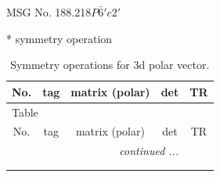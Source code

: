 \documentclass[fleqn,8pt]{jsarticle}
\begin{document}
\setcounter{MaxMatrixCols}{32}

\renewcommand{\tablename}{Table~}
\renewcommand{\figurename}{Figure~}
\begin{center}
\LARGE
MSG No. 188.218\quad$P\bar{6}'c2'$
\end{center}
* symmetry operation
\renewcommand{\arraystretch}{1.3}
\begin{longtable}{ccccc}
\caption{Symmetry operations for 3d polar vector.}
 \\
 \hline \hline
No. & tag & matrix (polar) & det & TR \\ \hline \endfirsthead

\multicolumn{4}{l}{\tablename\ \thetable{}} \\
 \hline \hline
No. & tag & matrix (polar) & det & TR \\ \hline \endhead

 \hline \hline
\multicolumn{4}{r}{\footnotesize\it continued ...} \\ \endfoot

 \hline \hline
\multicolumn{4}{r}{} \\ \endlastfoot


\end{longtable}
\end{document}
